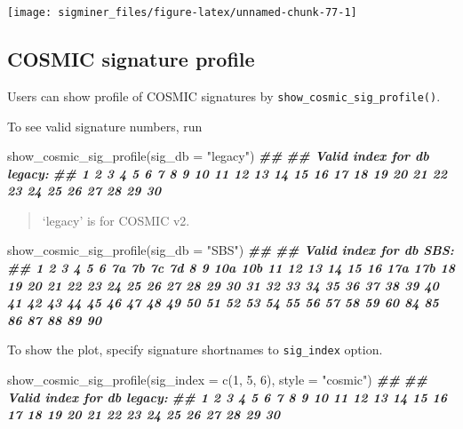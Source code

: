 \documentclass[
  12pt,
  a4paper,
  twoside]{book}
\newenvironment{Shaded}{\begin{snugshade}}{\end{snugshade}}
\newcommand{\AttributeTok}[1]{\textcolor[rgb]{0.77,0.63,0.00}{#1}}
\newcommand{\DecValTok}[1]{\textcolor[rgb]{0.00,0.00,0.81}{#1}}
\newcommand{\DocumentationTok}[1]{\textcolor[rgb]{0.56,0.35,0.01}{\textbf{\textit{#1}}}}
\newcommand{\FunctionTok}[1]{\textcolor[rgb]{0.00,0.00,0.00}{#1}}
\newcommand{\NormalTok}[1]{#1}
\newcommand{\StringTok}[1]{\textcolor[rgb]{0.31,0.60,0.02}{#1}}
\begin{document}
\texttt{[image: sigminer\_files/figure-latex/unnamed-chunk-77-1]}

\hypertarget{cosmic-signature-profile}{%
\subsection{COSMIC signature profile}\label{cosmic-signature-profile}}

Users can show profile of COSMIC signatures by \texttt{show\_cosmic\_sig\_profile()}.

To see valid signature numbers, run

\begin{Shaded}
\begin{Highlighting}[]
\FunctionTok{show\_cosmic\_sig\_profile}\NormalTok{(}\AttributeTok{sig\_db =} \StringTok{"legacy"}\NormalTok{)}
\DocumentationTok{\#\# }
\DocumentationTok{\#\# Valid index for db \textquotesingle{}legacy\textquotesingle{}:}
\DocumentationTok{\#\# 1 2 3 4 5 6 7 8 9 10 11 12 13 14 15 16 17 18 19 20 21 22 23 24 25 26 27 28 29 30}
\end{Highlighting}
\end{Shaded}

\begin{quote}
`legacy' is for COSMIC v2.
\end{quote}

\begin{Shaded}
\begin{Highlighting}[]
\FunctionTok{show\_cosmic\_sig\_profile}\NormalTok{(}\AttributeTok{sig\_db =} \StringTok{"SBS"}\NormalTok{)}
\DocumentationTok{\#\# }
\DocumentationTok{\#\# Valid index for db \textquotesingle{}SBS\textquotesingle{}:}
\DocumentationTok{\#\# 1 2 3 4 5 6 7a 7b 7c 7d 8 9 10a 10b 11 12 13 14 15 16 17a 17b 18 19 20 21 22 23 24 25 26 27 28 29 30 31 32 33 34 35 36 37 38 39 40 41 42 43 44 45 46 47 48 49 50 51 52 53 54 55 56 57 58 59 60 84 85 86 87 88 89 90}
\end{Highlighting}
\end{Shaded}

To show the plot, specify signature shortnames to \texttt{sig\_index} option.

\begin{Shaded}
\begin{Highlighting}[]
\FunctionTok{show\_cosmic\_sig\_profile}\NormalTok{(}\AttributeTok{sig\_index =} \FunctionTok{c}\NormalTok{(}\DecValTok{1}\NormalTok{, }\DecValTok{5}\NormalTok{, }\DecValTok{6}\NormalTok{), }\AttributeTok{style =} \StringTok{"cosmic"}\NormalTok{)}
\DocumentationTok{\#\# }
\DocumentationTok{\#\# Valid index for db \textquotesingle{}legacy\textquotesingle{}:}
\DocumentationTok{\#\# 1 2 3 4 5 6 7 8 9 10 11 12 13 14 15 16 17 18 19 20 21 22 23 24 25 26 27 28 29 30}
\end{Highlighting}
\end{Shaded}
\end{document}
